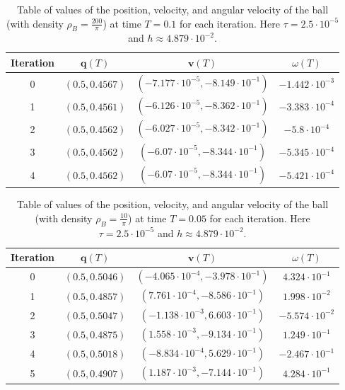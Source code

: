 \documentclass[a4paper]{amsart}
\numberwithin{equation}{section}
\theoremstyle{plain}
\newcommand{\mbf}[1]{\mathbf{#1}}
\begin{document}
\begin{table}[ht]
    \centering
    \begin{tabular}{|c|c|c|c|}
    \hline
        Iteration & $\mbf{q}(T)$ & $\mbf{v}(T)$ & $\omega(T)$\\
        \hline
        0 & $(0.5,0.4567)$ &   $(-7.177\cdot 10^{-5},-8.149\cdot 10^{-1})$ & $-1.442\cdot 10^{-3}$\\
        \hline
        1 & $(0.5,0.4561)$ & $(-6.126\cdot 10^{-5},-8.362\cdot 10^{-1})$ & $-3.383\cdot 10^{-4}$\\
        \hline
        2 & $(0.5,0.4562)$ & $(-6.027\cdot 10^{-5},-8.342\cdot 10^{-1})$ & $-5.8\cdot 10^{-4}$\\
        \hline
        3 & $(0.5,0.4562)$ & $(-6.07\cdot 10^{-5},-8.344\cdot 10^{-1})$ & $-5.345\cdot 10^{-4}$\\
        \hline
        4 & $(0.5,0.4562)$ & $(-6.07\cdot 10^{-5},-8.344\cdot 10^{-1})$ & $-5.421\cdot 10^{-4}$\\
        \hline
    \end{tabular}
    \caption{Table of values of the position, velocity, and angular velocity of the ball (with density $\rho_B = \frac{200}{\pi}$) at time $T = 0.1$ for each iteration.
    Here $\tau = 2.5\cdot 10^{-5}$ and $h \approx 4.879\cdot 10^{-2}$.}
    \label{table: fsi convergence refined}
\end{table}

\begin{table}[ht]
    \centering
    \begin{tabular}{|c|c|c|c|}
    \hline
        Iteration & $\mbf{q}(T)$ & $\mbf{v}(T)$ & $\omega(T)$\\
        \hline
        0 & $(0.5,0.5046)$ &   $(-4.065\cdot 10^{-4},-3.978\cdot 10^{-1})$ & $4.324\cdot 10^{-1}$\\
        \hline
        1 & $(0.5,0.4857)$ & $(7.761\cdot 10^{-4},-8.586\cdot 10^{-1})$ & $1.998\cdot 10^{-2}$\\
        \hline
        2 & $(0.5,0.5047)$ & $(-1.138\cdot 10^{-3},6.603\cdot 10^{-1})$ & $-5.574\cdot 10^{-2}$\\
        \hline
        3 & $(0.5,0.4875)$ & $(1.558\cdot 10^{-3},-9.134\cdot 10^{-1})$ & $1.249\cdot 10^{-1}$\\
        \hline
        4 & $(0.5,0.5018)$ & $(-8.834\cdot 10^{-4},5.629\cdot 10^{-1})$ & $-2.467\cdot 10^{-1}$\\
        \hline
        5 & $(0.5,0.4907)$ & $(1.187\cdot 10^{-3},-7.144\cdot 10^{-1})$ & $4.284\cdot 10^{-1}$\\
        \hline
    \end{tabular}
    \caption{Table of values of the position, velocity, and angular velocity of the ball (with density $\rho_B = \frac{10}{\pi}$) at time $T = 0.05$ for each iteration.
    Here $\tau = 2.5\cdot 10^{-5}$ and $h \approx 4.879\cdot 10^{-2}$.}
    \label{table: fsi failure refined}
\end{table}
\end{document}
